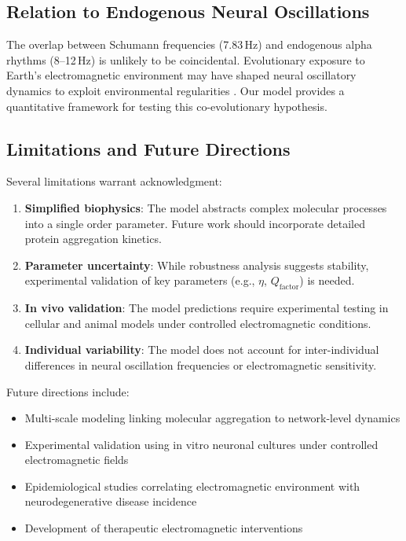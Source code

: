 \documentclass[10pt,a4paper]{article}
\begin{document}
\subsection{Relation to Endogenous Neural Oscillations}

The overlap between Schumann frequencies (7.83\,Hz) and endogenous alpha rhythms 
(8--12\,Hz) is unlikely to be coincidental. Evolutionary exposure to Earth's 
electromagnetic environment may have shaped neural oscillatory dynamics to exploit 
environmental regularities \citep{williams2009schumann, frhlich2016endogenous}. Our 
model provides a quantitative framework for testing this co-evolutionary hypothesis.

\subsection{Limitations and Future Directions}

Several limitations warrant acknowledgment:

\begin{enumerate}
    \item \textbf{Simplified biophysics}: The model abstracts complex molecular processes 
    into a single order parameter. Future work should incorporate detailed protein 
    aggregation kinetics.
    
    \item \textbf{Parameter uncertainty}: While robustness analysis suggests stability, 
    experimental validation of key parameters (e.g., $\eta$, $Q_{\text{factor}}$) is needed.
    
    \item \textbf{In vivo validation}: The model predictions require experimental testing 
    in cellular and animal models under controlled electromagnetic conditions.
    
    \item \textbf{Individual variability}: The model does not account for inter-individual 
    differences in neural oscillation frequencies or electromagnetic sensitivity.
\end{enumerate}

Future directions include:
\begin{itemize}
    \item Multi-scale modeling linking molecular aggregation to network-level dynamics
    \item Experimental validation using in vitro neuronal cultures under controlled 
    electromagnetic fields
    \item Epidemiological studies correlating electromagnetic environment with 
    neurodegenerative disease incidence
    \item Development of therapeutic electromagnetic interventions
\end{itemize}
\end{document}
